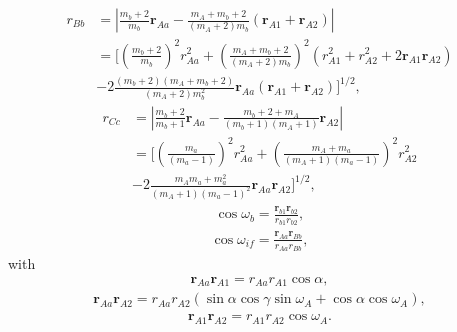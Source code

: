 \begin{equation}\label{eq176}
\begin{split}
r_{Bb}&=\left|\frac{m_b+2}{m_b}\mathbf{r}_{Aa}-\frac{m_A+m_b+2}{(m_A+2)m_b}
(\mathbf{r}_{A1}+\mathbf{r}_{A2})\right|\\
&=\Biggl[\left(\frac{m_b+2}{m_b}\right)^2r_{Aa}^2+
\left(\frac{m_A+m_b+2}{(m_A+2)m_b}\right)^2(r_{A1}^2+r_{A2}^2+2\mathbf{r}_{A1}\mathbf{r}_{A2})\\
&-2\frac{(m_b+2)(m_A+m_b+2)}{(m_A+2)m_b^2}\mathbf{r}_{Aa}(\mathbf{r}_{A1}+\mathbf{r}_{A2})\Biggr]^{1/2},
\end{split}
\end{equation}
\hspace{0.5cm}
\begin{equation}\label{eq186}
\begin{split}
r_{Cc}&=\left|\frac{m_b+2}{m_b+1}\mathbf{r}_{Aa}-\frac{m_b+2+m_A}{(m_b+1)(m_A+1)}\mathbf{r}_{A2}\right|\\
&=\Biggl[\left(\frac{m_a}{(m_a-1)}\right)^2r_{Aa}^2+
\left(\frac{m_A+m_a}{(m_A+1)(m_a-1)}\right)^2r_{A2}^2\\
&-2\frac{m_Am_a+m_a^2}{(m_A+1)(m_a-1)^2}\mathbf{r}_{Aa}\mathbf{r}_{A2}\Biggr]^{1/2},
\end{split}
\end{equation}
\hspace{0.5cm}
\begin{equation}\label{eq181}
\begin{split}
\cos\omega_b=\frac{\mathbf{r}_{b1}\mathbf{r}_{b2}}{r_{b1}r_{b2}},
\end{split}
\end{equation}
\hspace{0.5cm}
\begin{equation}\label{eq182}
\begin{split}
\cos\omega_{if}=\frac{\mathbf{r}_{Aa}\mathbf{r}_{Bb}}{r_{Aa}r_{Bb}},
\end{split}
\end{equation}
with
\begin{equation}\label{eq183}
\begin{split}
\mathbf{r}_{Aa}\mathbf{r}_{A1}=r_{Aa}r_{A1}\cos\alpha,
\end{split}
\end{equation}
\begin{equation}\label{eq184}
\begin{split}
\mathbf{r}_{Aa}\mathbf{r}_{A2}=r_{Aa}r_{A2}(\sin\alpha\cos\gamma\sin\omega_A+\cos\alpha\cos\omega_A),
\end{split}
\end{equation}
\begin{equation}\label{eq185}
\begin{split}
\mathbf{r}_{A1}\mathbf{r}_{A2}=r_{A1}r_{A2}\cos\omega_A.
\end{split}
\end{equation}
